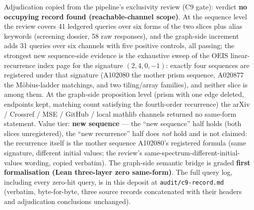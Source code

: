 \documentclass[11pt]{article}
\begin{document}
Adjudication copied from the pipeline's exclusivity review (C9 gate): verdict
\textbf{no occupying record found (reachable-channel scope)}. At the sequence
level the review covers 41 ledgered queries over six forms of the two slices
plus alias keywords (screening dossier, 58 raw responses), and the graph-side
increment adds 31 queries over six channels with five positive controls, all
passing; the strongest new sequence-side evidence is the exhaustive sweep of
the OEIS linear-recurrence index page for the signature $(2,4,0,-1)$: exactly
four sequences are registered under that signature (A102080 the mother prism
sequence, A020877 the M\"obius-ladder matchings, and two tiling/array
families), and neither slice is among them. At the graph-side proposition
level (prism with one edge deleted, endpoints kept, matching count satisfying
the fourth-order recurrence) the arXiv / Crossref / MSE / GitHub / local
mathlib channels returned no same-form statement. Value tier: \textbf{new
sequence} --- the ``new sequence'' half holds (both slices unregistered), the
``new recurrence'' half does \emph{not} hold and is not claimed: the
recurrence itself is the mother sequence A102080's registered formula (same
signature, different initial values; the review's
same-spectrum-different-initial-values wording, copied verbatim). The
graph-side semantic bridge is graded \textbf{first formalisation (Lean
three-layer zero same-form)}. The full query log, including every zero-hit
query, is in this deposit at \texttt{audit/c9-record.md} (verbatim,
byte-for-byte, three source records concatenated with their headers and
adjudication conclusions unchanged).
\end{document}
